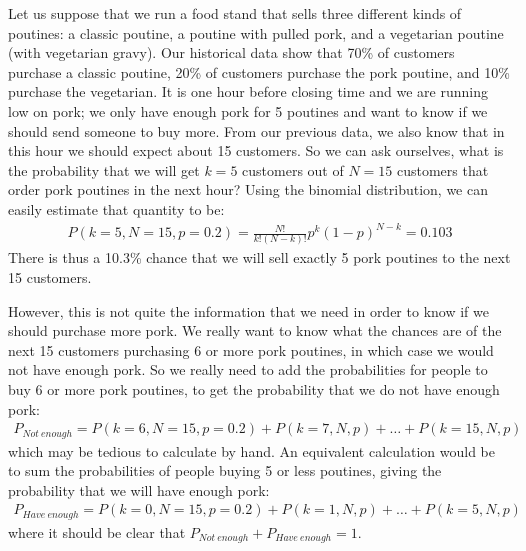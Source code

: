 Let us suppose that we run a food stand that sells three different kinds of poutines: a classic poutine, a poutine with pulled pork, and a vegetarian poutine (with vegetarian gravy). Our historical data show that 70\% of customers purchase a classic poutine, 20\% of customers purchase the pork poutine, and 10\% purchase the vegetarian. It is one hour before closing time and we are running low on pork; we only have enough pork for 5 poutines and want to know if we should send someone to buy more. From our previous data, we also know that in this hour we should expect about 15 customers. So we can ask ourselves, what is the probability that we will get $k=5$ customers out of $N=15$ customers that order pork poutines in the next hour? Using the binomial distribution, we can easily estimate that quantity to be:
\begin{align*}
P(k=5,N=15,p=0.2)=\frac{N!}{k!(N-k)!}p^k(1-p)^{N-k}=0.103
\end{align*}
There is thus a 10.3\% chance that we will sell exactly 5 pork poutines to the next 15 customers.


However, this is not quite the  information that we need in order to know if we should purchase more pork. We really want to know what the chances are of the next 15 customers purchasing 6 or more pork poutines, in which case we would not have enough pork. So we really need to add the probabilities for people to buy 6 or more pork poutines, to get the probability that we do not have enough pork:
\begin{align*}
P_{Not\: enough}=P(k=6,N=15,p=0.2)+P(k=7,N,p)+\dots+P(k=15,N,p)
\end{align*}
which may be tedious to calculate by hand. An equivalent calculation would be to sum the probabilities of people buying 5 or less poutines, giving the probability that we will have enough pork:
\begin{align*}
P_{Have\: enough}=P(k=0,N=15,p=0.2)+P(k=1,N,p)+\dots+P(k=5,N,p)
\end{align*}
where it should be clear that $P_{Not\: enough}+P_{Have\: enough}=1$.

